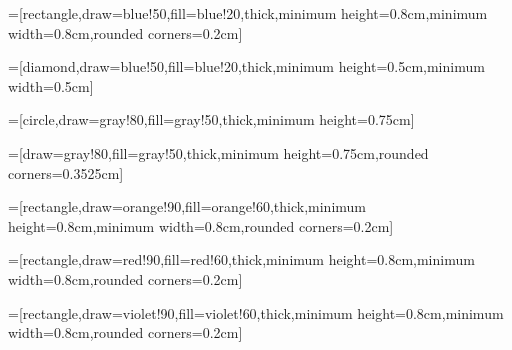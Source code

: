 \usepackage{tikz}
\usepackage{pgfplots}
\pgfplotsset{compat=1.7}

\usetikzlibrary{arrows,calc,shapes,decorations.pathreplacing,calligraphy}
\tikzset{>=latex}
	

	
=[rectangle,draw=blue!50,fill=blue!20,thick,minimum height=0.8cm,minimum width=0.8cm,rounded corners=0.2cm]

=[diamond,draw=blue!50,fill=blue!20,thick,minimum height=0.5cm,minimum width=0.5cm]

=[circle,draw=gray!80,fill=gray!50,thick,minimum height=0.75cm]

=[draw=gray!80,fill=gray!50,thick,minimum height=0.75cm,rounded corners=0.3525cm]
 
=[rectangle,draw=orange!90,fill=orange!60,thick,minimum height=0.8cm,minimum width=0.8cm,rounded corners=0.2cm]

=[rectangle,draw=red!90,fill=red!60,thick,minimum height=0.8cm,minimum width=0.8cm,rounded corners=0.2cm]

=[rectangle,draw=violet!90,fill=violet!60,thick,minimum height=0.8cm,minimum width=0.8cm,rounded corners=0.2cm]




\newcommand{\Left}[3]{
 	\pgfmathparse{#1 + #3}
 	\node[tensor] (tens) at (#1 , #2) {};
	\node (d1) at (\pgfmathresult , #2 + 1.5) {};
 	\node (d2) at (\pgfmathresult , #2 - 1.5) {};
 	\node (d3) at (\pgfmathresult , #2) {};    
    
    \draw[-] (d1.west) .. controls (#1, #2 + 1.5) .. (tens.north);
    \draw[-] (d2.west) .. controls (#1, #2 - 1.5) .. (tens.south);
	\draw[-] (tens) -- (d3);
}

\newcommand{\Right}[3]{
 	\pgfmathparse{#1 - #3}
 	\node[tensor] (tens) at (#1 , #2) {};
	\node (d1) at (\pgfmathresult , #2 + 1.5) {};
 	\node (d2) at (\pgfmathresult , #2 - 1.5) {};
 	\node (d3) at (\pgfmathresult , #2) {};    
    
    \draw[-] (d1.east) .. controls (#1, #2 + 1.5) .. (tens.north);
    \draw[-] (d2.east) .. controls (#1, #2 - 1.5) .. (tens.south);
	\draw[-] (tens) -- (d3);
}

\newcommand{\SVD}[3]{
 	\node[tensor] (U) at (#1 , #2) {};
	\node (Ulabel) at (#1 , #2 + 0.6) {$U$};
	\draw[-] (U) -- (#1 -0.8, #2);
	\draw[-] (U) -- (#1 , #2 - 0.8); 	
 	
 	\node[matrix] (S) at (#1 + #3, #2) {};
 	\node (Slabel) at (#1 + #3 , #2 + 0.6) {$S$};	
 	
 	\node[tensor] (V) at (#1 + #3 *2 , #2) {};
 	\node (Vlabel) at (#1 + #3 *2 , #2 + 0.6) {$V^{\dag}$};
 	\draw[-] (V) -- (#1 + #3 *2 +0.8, #2);
	\draw[-] (V) -- (#1 + #3 *2 , #2 - 0.8);
	
	\draw[-] (U) -- (S);
	\draw[-] (V) -- (S);
}

